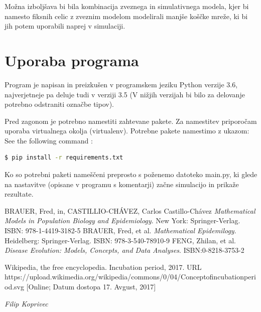 \documentclass[a4paper, 11pt]{article}
\begin{document}
Možna izboljšava bi bila kombinacija zveznega in simulativnega modela, kjer bi namesto fiksnih celic z zveznim modelom modelirali manjše koščke mreže, ki bi jih potem uporabili naprej v simulaciji.

\section*{Uporaba programa}
Program je napisan in preizkušen v programskem jeziku Python verzije 3.6, najverjetneje pa deluje tudi v verziji 3.5 (V nižjih verzijah bi bilo za delovanje potrebno odstraniti označbe tipov). 

Pred zagonom je potrebno namestiti zahtevane pakete. Za namestitev priporočam uporaba virtualnega okolja (virtualenv). Potrebne pakete namestimo z ukazom:
\noindent See the following command :
\begin{lstlisting}[language=bash]
  $ pip install -r requirements.txt
\end{lstlisting}

Ko so potrebni paketi nameščeni preprosto s poženemo datoteko main.py, ki glede na nastavitve (opisane v programu s komentarji) začne simulacijo in prikaže rezultate.




\begin{thebibliography}{9}
 BRAUER, Fred, in, CASTILLIO-CHÁVEZ, Carlos Castillo-Chávez \emph{Mathematical Models in Population Biology and Epidemiology}. New York: Springer-Verlag. ISBN: 978-1-4419-3182-5
  BRAUER, Fred, et al. \emph{Mathematical Epidemilogy}. Heidelberg: Springer-Verlag. ISBN: 978-3-540-78910-9
 FENG, Zhilan, et al. \emph{Disease Evolution: Models, Concepts, and Data Analyses}. ISBN:0-8218-3753-2

 Wikipedia, the free encyclopedia. Incubation period, 2017. URL https://upload.wikimedia.org/wikipedia/commons/0/04/Concept\textunderscore of\textunderscore incubation\textunderscore period.svg [Online; Datum dostopa 17. Avgust, 2017]
\end{thebibliography}


\hfill \textit{Filip Koprivec}
\end{document}
